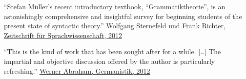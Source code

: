 {``Stefan Müller’s recent introductory textbook, ``Grammatiktheorie'', is an astonishingly
comprehensive and insightful survey for beginning students of the present state of syntactic
theory.'' \href{http://dx.doi.org/10.1515/zfs-2012-0010}{Wolfgang Sternefeld und Frank Richter, Zeitschrift für Sprachwissenschaft, 2012}


``This is the kind of work that has been sought after for a while. [\dots] The impartial and objective discussion offered by the author is particularly refreshing.'' \href{http://dx.doi.org/10.1515/germ-2011-537}{Werner Abraham, Germanistik, 2012}

}
\dedication{For Max}
\renewcommand{\lsISBNdigital}{978-3-944675-21-3}
\renewcommand{\lsISBNhardcover}{978-3-946234-29-6}
\renewcommand{\lsISBNsoftcover}{978-3-946234-30-2}
\renewcommand{\lsSeries}{tbls} %
\renewcommand{\lsSeriesNumber}{1} %
\renewcommand{\lsURL}{http://langsci-press.org/catalog/book/25} %


